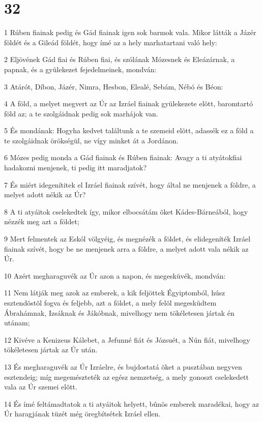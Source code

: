 \chapter{32}

\par 1 Rúben fiainak pedig és Gád fiainak igen sok barmok vala. Mikor látták a Jázér földét és a Gileád földét, hogy ímé az a hely marhatartani való hely:
\par 2 Eljövének Gád fiai és Rúben fiai, és szólának Mózesnek és Eleázárnak, a papnak, és a gyülekezet fejedelmeinek, mondván:
\par 3 Atárót, Díbon, Jázér, Nimra, Hesbon, Elealé, Sebám, Nébó és Béon:
\par 4 A föld, a melyet megvert az Úr az Izráel fiainak gyülekezete elõtt, baromtartó föld az; a te szolgáidnak pedig sok marhájok van.
\par 5 És mondának: Hogyha kedvet találtunk a te szemeid elõtt, adassék ez a föld a te szolgáidnak örökségül, ne vígy minket át a Jordánon.
\par 6 Mózes pedig monda a Gád fiainak és Rúben fiainak: Avagy a ti atyátokfiai hadakozni menjenek, ti pedig itt maradjatok?
\par 7 És miért idegenítitek el Izráel fiainak szívét, hogy által ne menjenek a földre, a melyet adott nékik az Úr?
\par 8 A ti atyáitok cselekedtek így, mikor elbocsátám õket Kádes-Bárneából, hogy nézzék meg azt a földet;
\par 9 Mert felmentek az Eskól völgyéig, és megnézék a földet, és elidegeníték Izráel fiainak szívét, hogy be ne menjenek arra a földre, a melyet adott vala nékik az Úr.
\par 10 Azért megharaguvék az Úr azon a napon, és megesküvék, mondván:
\par 11 Nem látják meg azok az emberek, a kik feljöttek Égyiptomból, húsz esztendõstõl fogva és feljebb, azt a földet, a mely felõl megesküdtem Ábrahámnak, Izsáknak és Jákóbnak, mivelhogy nem tökéletesen jártak én utánam;
\par 12 Kivéve a Kenizeus Kálebet, a Jefunné fiát és Józsuét, a Nún fiát, mivelhogy tökéletesen jártak az Úr után.
\par 13 És megharaguvék az Úr Izráelre, és bujdostatá õket a pusztában negyven esztendeig; míg megemészteték az egész nemzetség, a mely gonoszt cselekedett vala az Úr szemei elõtt.
\par 14 És ímé feltámadtatok a ti atyáitok helyett, bûnös emberek maradékai, hogy az Úr haragjának tüzét még öregbítsétek Izráel ellen.
